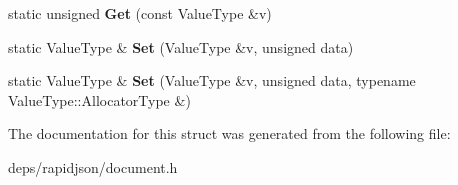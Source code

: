 \begin{DoxyCompactItemize}
\item 
static unsigned {\bfseries Get} (const Value\+Type \&v)\hypertarget{structinternal_1_1_type_helper_3_01_value_type_00_01unsigned_01_4_a2f91befe1e9e914e7431b84c0d89f572}{}\label{structinternal_1_1_type_helper_3_01_value_type_00_01unsigned_01_4_a2f91befe1e9e914e7431b84c0d89f572}

\item 
static Value\+Type \& {\bfseries Set} (Value\+Type \&v, unsigned data)\hypertarget{structinternal_1_1_type_helper_3_01_value_type_00_01unsigned_01_4_a1d960542fd618ac649fe4e045c44f789}{}\label{structinternal_1_1_type_helper_3_01_value_type_00_01unsigned_01_4_a1d960542fd618ac649fe4e045c44f789}

\item 
static Value\+Type \& {\bfseries Set} (Value\+Type \&v, unsigned data, typename Value\+Type\+::\+Allocator\+Type \&)\hypertarget{structinternal_1_1_type_helper_3_01_value_type_00_01unsigned_01_4_a601b05a233b6025486a9105d45d46780}{}\label{structinternal_1_1_type_helper_3_01_value_type_00_01unsigned_01_4_a601b05a233b6025486a9105d45d46780}

\end{DoxyCompactItemize}


The documentation for this struct was generated from the following file\+:\begin{DoxyCompactItemize}
\item 
deps/rapidjson/document.\+h\end{DoxyCompactItemize}
